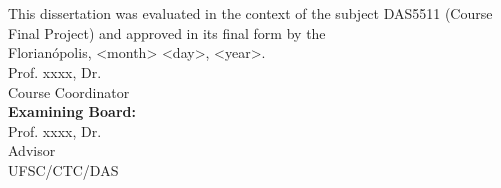 \imprimircapa

\imprimirfolhaderosto*

\begin{fichacatalografica}
	
\end{fichacatalografica}

\begin{folhadeaprovacao}
	\OnehalfSpacing
	\centering
	\imprimirautor\\%
	\vspace*{10pt}		
	\textbf{\imprimirtitulo}%
	\ifnotempty{\imprimirsubtitulo}{:~\imprimirsubtitulo}\\%
	\vspace*{\baselineskip}
	
	This dissertation was evaluated in the context of the subject DAS5511 (Course Final Project) and approved in its final form by the \imprimircurso\\
	\vspace*{\baselineskip}
	Florianópolis, <month> <day>, <year>.\\
	
	
	\vspace*{2\baselineskip}
	Prof. xxxx, Dr.\\
	Course Coordinator\\
	
	\vspace*{\baselineskip}
	\textbf{Examining Board:} \\
	
	
	\vspace*{2\baselineskip}
	Prof. xxxx, Dr.\\
	Advisor \\
	UFSC/CTC/DAS\\
	

\end{folhadeaprovacao}
